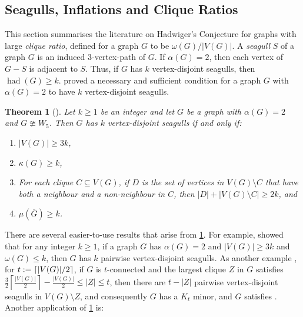 \documentclass[11pt]{article}
\numberwithin{equation}{section}
\theoremstyle{plain}
\newtheorem{thm}[equation]{Theorem}
\theoremstyle{definition}
\DeclarePairedDelimiter{\ceil}{\lceil}{\rceil}
\renewcommand{\geq}{\geqslant}
\renewcommand{\leq}{\leqslant}
\DeclareMathOperator{\had}{had}
\newcommand{\defn}[1]{\textcolor{green!50!black}{\textit{#1}}}
\begin{document}
\subsection{Seagulls, Inflations and Clique Ratios}
\label{ss:seagulls}

This section summarises the literature on Hadwiger's Conjecture for graphs with large \defn{clique ratio}, defined for a graph $G$ to be $\omega(G) / |V(G)|$.
A \defn{seagull} $S$ of a graph $G$ is an induced $3$-vertex-path of $G$. If $\alpha(G) = 2$, then each vertex of $G - S$ is adjacent to $S$.
Thus, if $G$ has $k$ vertex-disjoint seagulls, then $\had(G) \geq k$. \citet{CS12} proved a necessary and sufficient condition for a graph $G$ with $\alpha(G) = 2$ to have $k$ vertex-disjoint seagulls.

\begin{thm}[\citet{CS12}]
    \label{thm:seagulls}
    Let $k \geq 1$ be an integer and let $G$ be a graph with $\alpha(G) = 2$ and $G \ncong W_5$. Then $G$ has $k$ vertex-disjoint seagulls if and only if:
    \begin{enumerate}
        \item $|V(G)| \geq 3k$,
        \item $\kappa(G) \geq k$,
        \item For each clique $C \subseteq V(G)$, if $D$ is the set of vertices in $V(G) \setminus C$ that have both a neighbour and a non-neighbour in $C$, then $|D| + |V(G) \setminus C| \geq 2k$, and
        \item $\mu(\overline{G}) \geq k$.
    \end{enumerate}
\end{thm}
There are several easier-to-use results that arise from \cref{thm:seagulls}. For example, \citet{NS26a} showed that for any integer $k\geq 1$, if a graph $G$ has $\alpha(G) = 2$ and $|V(G)| \geq 3k$ and $\omega(G) \leq k$, then $G$ has $k$ pairwise vertex-disjoint seagulls. As another example \citep{CS12}, for $t := \ceil{|V(G)| / 2}$, if $G$ is $t$-connected and the largest clique $Z$ in $G$ satisfies $\frac{3}{2} \left \lceil \frac{|V(G)|}{2} \right \rceil - \frac{|V(G)|}{2} \leq |Z| \leq t$, then there are $t-|Z|$ pairwise vertex-disjoint seagulls in $V(G) \setminus Z$, and consequently $G$ has a $K_t$ minor, and $G$ satisfies . Another application of \cref{thm:seagulls} is:
\end{document}

